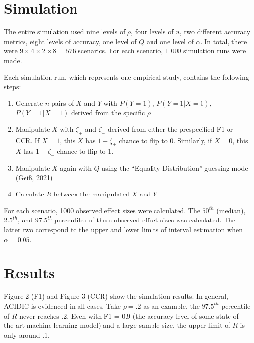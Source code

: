 \documentclass[english,man,floatsintext]{apa6}
\providecommand{\tightlist}{%
  \setlength{\itemsep}{0pt}\setlength{\parskip}{0pt}}
\begin{document}
\hypertarget{simulation}{%
\section{Simulation}\label{simulation}}

The entire simulation used nine levels of \(\rho\), four levels of \(n\), two different accuracy metrics, eight levels of accuracy, one level of \(Q\) and one level of \(\alpha\). In total, there were \(9 \times 4 \times 2 \times 8 = 576\) scenarios. For each scenario, 1 000 simulation runs were made.

Each simulation run, which represents one empirical study, contains the following steps:

\begin{enumerate}
\def\labelenumi{\arabic{enumi}.}
\tightlist
\item
  Generate \(n\) pairs of \(X\) and \(Y\) with \(P(Y=1)\), \(P(Y=1|X=0)\), \(P(Y=1|X=1)\) derived from the specific \(\rho\)
\item
  Manipulate \(X\) with \(\zeta_{+}\) and \(\zeta_{-}\) derived from either the prespecified F1 or CCR. If \(X = 1\), this \(X\) has \(1 - \zeta_{+}\) chance to flip to 0. Similarly, if \(X = 0\), this \(X\) has \(1 - \zeta_{-}\) chance to flip to 1.
\item
  Manipulate \(X\) again with \(Q\) using the \enquote{Equality Distribution} guessing mode (Geiß, 2021)
\item
  Calculate \(R\) between the manipulated \(X\) and \(Y\)
\end{enumerate}

For each scenario, 1000 observed effect sizes were calculated. The \(50^{th}\) (median), \(2.5^{th}\), and \(97.5^{th}\) percentiles of these observed effect sizes was calculated. The latter two correspond to the upper and lower limits of interval estimation when \(\alpha = 0.05\).

\hypertarget{results}{%
\section{Results}\label{results}}

Figure 2 (F1) and Figure 3 (CCR) show the simulation results. In general, ACIDIC is evidenced in all cases. Take \(\rho = .2\) as an example, the \(97.5^{th}\) percentile of \(R\) never reaches .2. Even with F1 = 0.9 (the accuracy level of some state-of-the-art machine learning model) and a large sample size, the upper limit of \(R\) is only around .1.
\end{document}

